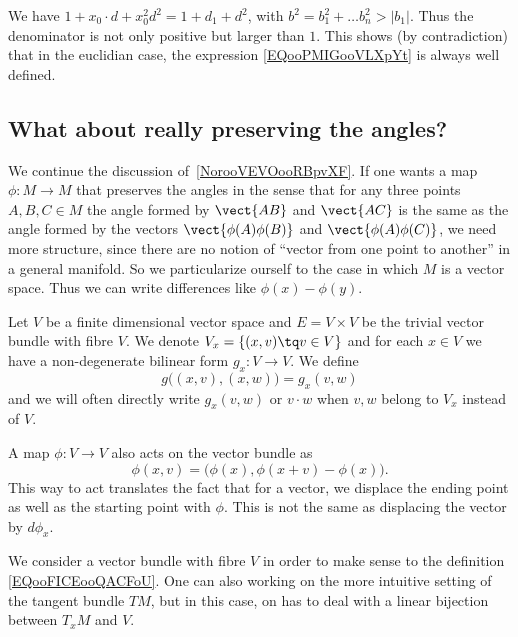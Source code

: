 We have \( 1+x_0\cdot d+x_0^2d^2=1+d_1+d^2\), with \( b^2=b_1^2+\ldots b_n^2>|b_1|\). Thus the denominator is not only positive but larger than \( 1\). This shows (by contradiction) that in the euclidian case, the expression \eqref{EQooPMIGooVLXpYt} is always well defined.

\subsection{What about really preserving the angles?}
\label{sebsecooCBKEooQOWqFo}

We continue the discussion of~\ref{NorooVEVOooRBpvXF}. If one wants a map \( \phi\colon M\to M\) that preserves the angles in the sense that for any three points \( A,B,C\in M\) the angle formed by \( \vect{ AB }\) and \( \vect{ AC }\) is the same as the angle formed by the vectors \( \vect{ \phi(A)\phi(B) }\) and \( \vect{ \phi(A)\phi(C) }\), we need more structure, since there are no notion of ``vector from one point to another'' in a general manifold. So we particularize ourself to the case in which \( M\) is a vector space. Thus we can write differences like \( \phi(x)-\phi(y)\).

Let \( V\) be a finite dimensional vector space and \( E=V\times V\) be the trivial vector bundle with fibre \( V\). We denote \( V_x=\{ (x,v)\tq v\in V \}\) and for each \( x\in V\) we have a non-degenerate bilinear form \( g_x\colon V\to V\). We define
\begin{equation}
    g\big( (x,v),(x,w) \big)=g_x(v,w)
\end{equation}
and we will often directly write \( g_x(v,w)\) or \( v\cdot w\) when \( v,w\) belong to \(V_x\) instead of \( V\).

A map \( \phi\colon V\to V\) also acts on the vector bundle as
\begin{equation}        \label{EQooFICEooQACFoU}
    \phi(x,v)=\big( \phi(x),\phi(x+v)-\phi(x) \big).
\end{equation}
This way to act translates the fact that for a vector, we displace the ending point as well as the starting point with \( \phi\). This is not the same as displacing the vector by \( d\phi_x\).

\begin{remark}
    We consider a vector bundle with fibre \( V\) in order to make sense to the definition \eqref{EQooFICEooQACFoU}. One can also working on the more intuitive setting of the tangent bundle \( TM\), but in this case, on has to deal with a linear bijection between \( T_xM\) and \( V\).
\end{remark}

